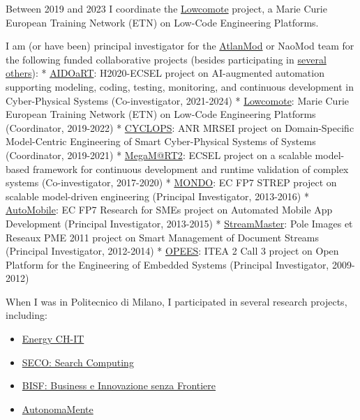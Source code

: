 Between 2019 and 2023 I coordinate the
\href{https://www.lowcomote.eu/}{Lowcomote} project, a Marie Curie
European Training Network (ETN) on Low-Code Engineering Platforms.

I am (or have been) principal investigator for the
\href{http://web.emn.fr/x-info/atlanmod/index.php?title=Main_Page}{AtlanMod}
or NaoMod team for the following funded collaborative projects (besides
participating in
\href{http://web.emn.fr/x-info/atlanmod/index.php?title=Projects}{several
others}): * \href{https://www.aidoart.eu/}{AIDOaRT}: H2020-ECSEL project
on AI-augmented automation supporting modeling, coding, testing,
monitoring, and continuous development in Cyber-Physical Systems
(Co-investigator, 2021-2024) *
\href{https://www.lowcomote.eu/}{Lowcomote}: Marie Curie European
Training Network (ETN) on Low-Code Engineering Platforms (Coordinator,
2019-2022) * \href{http://massimotisi.github.io}{CYCLOPS}: ANR MRSEI
project on Domain-Specific Model-Centric Engineering of Smart
Cyber-Physical Systems of Systems (Coordinator, 2019-2021) *
\href{https://megamart2-ecsel.eu/}{MegaM@RT2}: ECSEL project on a
scalable model-based framework for continuous development and runtime
validation of complex systems (Co-investigator, 2017-2020) *
\href{http://www.mondo-project.org/}{MONDO}: EC FP7 STREP project on
scalable model-driven engineering (Principal Investigator, 2013-2016) *
\href{http://automobile.webratio.com/}{AutoMobile}: EC FP7 Research for
SMEs project on Automated Mobile App Development (Principal
Investigator, 2013-2015) *
\href{http://www.irccyn.ec-nantes.fr/fr/projets-ivc/projet-streammaster-ivc}{StreamMaster}:
Pole Images et Reseaux PME 2011 project on Smart Management of Document
Streams (Principal Investigator, 2012-2014) *
\href{https://itea3.org/project/opees.html}{OPEES}: ITEA 2 Call 3
project on Open Platform for the Engineering of Embedded Systems
(Principal Investigator, 2009-2012)

When I was in Politecnico di Milano, I participated in several research
projects, including:

\begin{itemize}
\tightlist
\item
  \href{http://www.fondazionepolitecnico.it/it/cosa-facciamo/progetti-di-innovazione/item/energy-ch-it-distretto-per-le-tecnologie-e-i-materiali-per-l-efficienza-energetica-dell-insubria}{Energy
  CH-IT}
\item
  \href{https://cordis.europa.eu/project/rcn/88591/factsheet/en}{SECO:
  Search Computing}
\item
  \href{http://www.fondazionepolitecnico.it/it/cosa-facciamo/progetti-di-innovazione/item/bisf-business-e-innovazione-senza-frontiere}{BISF:
  Business e Innovazione senza Frontiere}
\item
  \href{http://autonomamente.como.polimi.it/index85f3.html?option=com_content\&task=view\&id=15\&Itemid=16}{AutonomaMente}
\end{itemize}
